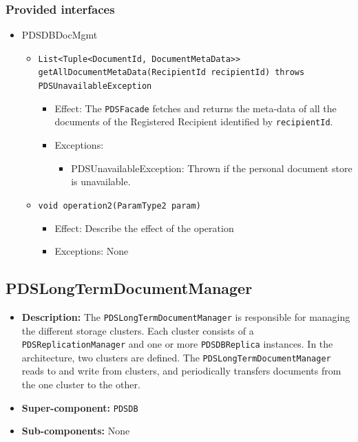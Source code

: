 \documentclass[a4paper,10pt]{article}
\begin{document}
\subsubsection*{Provided interfaces}
\begin{itemize}
    \item PDSDBDocMgmt
    \begin{itemize}
    
        \item \texttt{List<Tuple<DocumentId, DocumentMetaData>> getAllDocumentMetaData(RecipientId recipientId) throws PDSUnavailableException}
        \begin{itemize}
            \item Effect: The \texttt{PDSFacade} fetches and returns the meta-data of all the documents of the Registered Recipient identified by \texttt{recipientId}.
            \item Exceptions:
            \begin{itemize}
                \item PDSUnavailableException: Thrown if the personal document store is unavailable.
            \end{itemize}
		\end{itemize}
	
        \item \texttt{void operation2(ParamType2 param)}
        \begin{itemize}
             \item Effect: Describe the effect of the operation
             \item Exceptions: None
        \end{itemize}
     
    \end{itemize}
\end{itemize}

\subsection{PDSLongTermDocumentManager}
\begin{itemize}
    \item \textbf{Description:} The \texttt{PDSLongTermDocumentManager} is responsible for managing the different storage clusters. Each cluster consists of a \texttt{PDSReplicationManager} and one or more \texttt{PDSDBReplica} instances. In the architecture, two clusters are defined. The \texttt{PDSLongTermDocumentManager} reads to and write from clusters, and periodically transfers documents from the one cluster to the other.
    \item \textbf{Super-component:} \texttt{PDSDB}
    \item \textbf{Sub-components:} None
\end{itemize}
\end{document}
